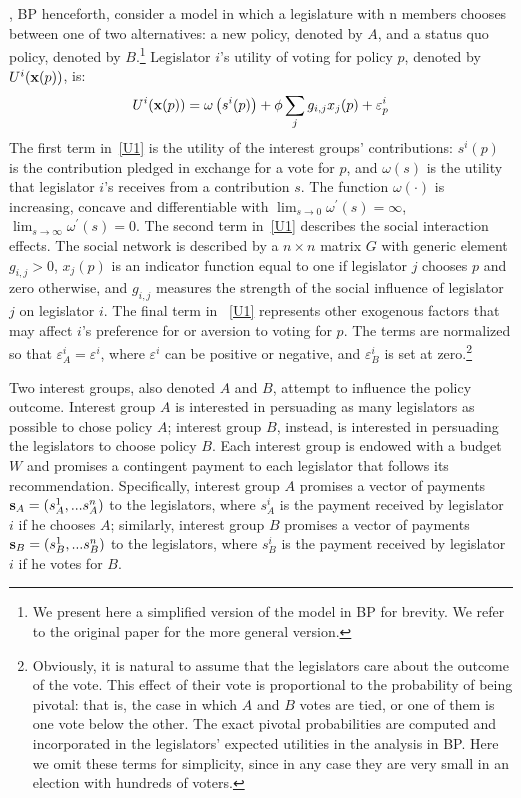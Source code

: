 \documentclass[nojss]{jss}
\begin{document}
\cite{Battaglini+Patacchini:2018}, BP henceforth, consider a model in which a legislature with n members chooses between one of two alternatives: a new policy, denoted by $A$, and a status quo policy, denoted by $B$.\footnote{We present here a simplified version of the model in BP for brevity. We refer to the original paper for the more general version.} Legislator $i$'s utility of voting for policy $p$, denoted by $U^{i}({\bf x}(p))$, is:
\begin{equation}
	U^{i}({\bf x}(p))=\omega \left( s^{i}(p)\right) +\phi
	\sum_{j}g_{i,j}x_{j}(p)+\varepsilon _{p}^{i}  \label{U1}
\end{equation}%
The first term in~\ref{U1} is the utility of the interest groups' contributions: $s^{i}(p)$ is the contribution pledged in exchange for a vote
for $p$, and $\omega \left( s\right) $ is the utility that legislator $i$'s
receives from a contribution $s$. The function $\omega (\cdot )$ is
increasing, concave and differentiable with $\lim_{s\rightarrow 0}\omega
^{\prime }(s)=\infty $, $\lim_{s\rightarrow \infty }\omega ^{\prime }(s)=0$.
The second term in~\ref{U1} describes the social interaction effects. The
social network is described by a $n\times n$ matrix $G$ with generic element  $g_{i,j}>0$, $x_{j}(p)$ is an indicator function equal to one if legislator $j$ chooses $p$ and zero otherwise, and $g_{i,j}$ measures the strength of the social influence of legislator $j$ on legislator $i$. The final term in ~\ref{U1} represents other exogenous factors that may affect $i$'s preference for or aversion to voting for $p$. The terms are normalized so that $\varepsilon _{A}^{i}=\varepsilon ^{i}$, where $\varepsilon ^{i}$ can be positive or negative, and $\varepsilon _{B}^{i}$ is set at zero.\footnote{Obviously, it is natural to assume that the legislators care about the outcome of the vote. This effect of their vote is proportional to the probability of being pivotal: that is, the case in which $A$ and $B$ votes are tied, or one of them is one vote below the other. The exact pivotal probabilities are computed and incorporated in the legislators' expected utilities in the analysis in BP. Here we omit these terms for simplicity, since in any case they are very small in an election with hundreds of voters.}

Two interest groups, also denoted $A$ and $B$, attempt to influence the
policy outcome. Interest group $A$ is interested in persuading as many
legislators as possible to chose policy $A$; interest group $B$, instead, is
interested in persuading the legislators to choose policy $B$. Each interest
group is endowed with a budget $W$ and promises a contingent
payment to each legislator that follows its recommendation. Specifically,
interest group $A$ promises a vector of payments ${\bf s}_{A}=(s_{A}^{1},...s_{A}^{n})$ to the legislators, where $s_{A}^{i}$ is the
payment received by legislator $i$ if he chooses $A$; similarly, interest
group $B$ promises a vector of payments ${\bf s}_{B}=(s_{B}^{1},...s_{B}^{n}) $ to the legislators, where $s_{B}^{i}$ is the payment received by legislator $i$ if he votes for $B$.
\end{document}
